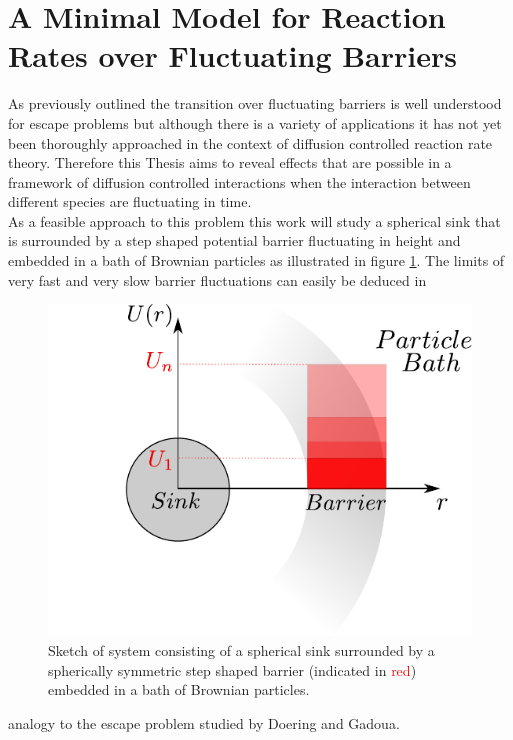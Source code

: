 \newpage
\section{A Minimal Model for Reaction Rates over Fluctuating Barriers}
\label{mini_model}
As previously outlined the transition over fluctuating barriers is well understood for escape problems but although there is a variety of applications it has not yet been thoroughly approached in the context of diffusion controlled reaction rate theory. Therefore this Thesis aims to reveal effects that are possible in a framework of diffusion controlled interactions when the interaction between different species are fluctuating in time. \\
As a feasible approach to this problem this work will study a spherical sink that is surrounded by a step shaped potential barrier fluctuating in height and embedded in a bath of Brownian particles as illustrated in figure \ref{introSketch}. The limits of very fast and very slow barrier fluctuations can easily be deduced in \par
\begin{figure}
    \hspace{-2 cm}\includegraphics[width = 1.1 \textwidth]{plots/IntroSkizze.pdf}
    \caption{Sketch of system consisting of a spherical sink surrounded by a spherically symmetric step shaped barrier (indicated in \textcolor{red}{red}) embedded in a bath of Brownian particles.}
    \label{introSketch}
\end{figure}
analogy to the escape problem studied by Doering and Gadoua.
